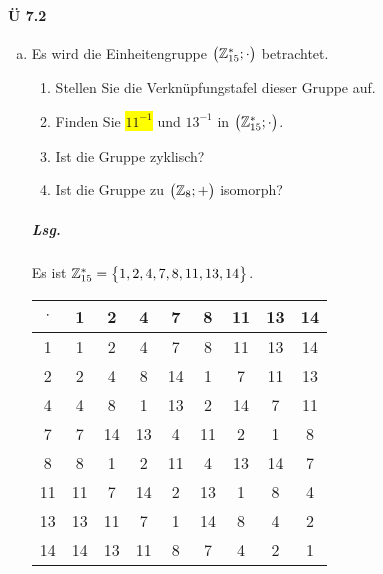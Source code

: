 \documentclass{scrreprt}
\begin{document}
\paragraph{Ü 7.2}
\begin{enumerate}[(a)]
\item Es wird die Einheitengruppe $\qty\big(\mathbb{Z}_{15}^*; \cdot)$
  betrachtet.
  \begin{enumerate}[(1)]
  \item Stellen Sie die Verknüpfungstafel dieser Gruppe auf.
  \item Finden Sie \colorbox{yellow}{$11^{-1}$} und \colorbox{blue!20}{$13^{-1}$}
    in $\qty\big(\mathbb{Z}_{15}^*; \cdot)$.
  \item Ist die Gruppe zyklisch?
  \item Ist die Gruppe zu $\qty\big(\mathbb{Z}_8; +)$ isomorph?
  \end{enumerate}

  \subparagraph{Lsg.} Es ist
  $\mathbb{Z}_{15}^* = \qty\big{1, 2, 4, 7, 8, 11, 13, 14}$.

  \begin{tabular}{|c|cccccccc|}
    \hline
    $\cdot$ & 1  & 2  & 4  & 7                    & 8  & 11                  & 13                   & 14 \\
    \hline
    1       & 1  & 2  & 4  & 7                    & 8  & 11                  & 13                   & 14 \\
    2       & 2  & 4  & 8  & 14                   & 1  & 7                   & 11                   & 13 \\
    4       & 4  & 8  & 1  & 13                   & 2  & 14                  & 7                    & 11 \\
    7       & 7  & 14 & 13 & 4                    & 11 & 2                   & \cellcolor{blue!20}1 & 8  \\
    8       & 8  & 1  & 2  & 11                   & 4  & 13                  & 14                   & 7  \\
    11      & 11 & 7  & 14 & 2                    & 13 & \cellcolor{yellow}1 & 8                    & 4  \\
    13      & 13 & 11 & 7  & \cellcolor{blue!20}1 & 14 & 8                   & 4                    & 2  \\
    14      & 14 & 13 & 11 & 8                    & 7  & 4                   & 2                    & 1  \\
    \hline
  \end{tabular}


\end{enumerate}
\end{document}

